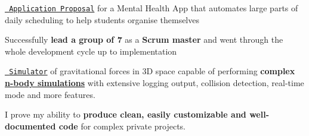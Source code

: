 \documentclass[]{jonas-cv}
\begin{document}
\begin{minipage}[t]{0.63\textwidth}
\vspace{-1mm}
\tinysectionsep
{}
\begin{tightemize}
    \item \href{https://github.com/j0ner0n/mobile-scheduling-app/blob/master/final-doc/software-engineering-g21.pdf}{\texttt{ Application Proposal}} for a Mental Health App that automates large parts of daily scheduling to help students organise themselves
    \item[\faicon{angle-double-right}] Successfully \textbf{lead a group of 7} as a \textbf{Scrum master} and went through the whole development cycle up to implementation
\end{tightemize}
\largesectionsep


\begin{tightemize}
    \item \href{https://github.com/j0ner0n/PhysicsSim}{\texttt{ Simulator}} of gravitational forces in 3D space capable of performing \textbf{complex \href{https://en.wikipedia.org/wiki/N-body_problem}{n-body simulations}} with extensive logging output, collision detection, real-time mode and more features.
    \item[\faicon{angle-double-right}] I prove my ability to \textbf{produce clean, easily customizable and well-documented code} for complex private projects.
\end{tightemize}
\largesectionsep



\end{minipage}
\end{document}
